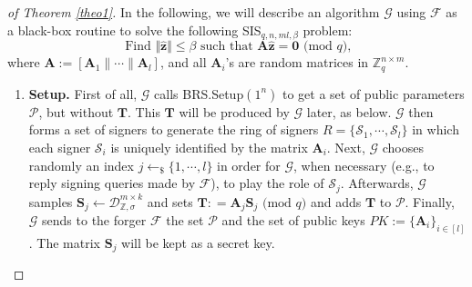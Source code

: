 \documentclass[runningheads]{llncs}
\begin{document}
\begin{proof}[of Theorem \ref{theo1}]
	
	In the following, we will describe an algorithm $\mathcal{G}$ using $\mathcal{F}$ as a black-box routine to solve the following \textsf{SIS}$_{q,n,ml, \beta}$ problem:
			\begin{equation}\label{key}
		\text{ Find }  \Vert \widehat{\mathbf{z}} \Vert \leq \beta \text{ such that } \mathbf{A}\widehat{\mathbf{z}}=\mathbf{0} \text{ (mod } q), 
			\end{equation}
			 where  $\mathbf{A}:=[\mathbf{A}_1\|\cdots\|\mathbf{A}_l]$, and all $\mathbf{A}_i$'s are random matrices in $\mathbb{Z}_q^{n \times m}$.
	\begin{enumerate}
		\item \textbf{Setup.} First of all, $\mathcal{G}$ calls \textsf{BRS.Setup}$(1^{n})$ to get a set of public parameters $\mathcal{P}$, but without $\mathbf{T}$. This $\mathbf{T}$ will be produced by $\mathcal{G}$ later, as below.  $\mathcal{G}$ then forms a set of signers to generate the ring of signers $R=\{\mathcal{S}_1, \cdots, \mathcal{S}_l \}$ in  which each signer $\mathcal{S}_i$ is uniquely identified by the matrix $\mathbf{A}_i$. Next,  $\mathcal{G}$ chooses randomly an index $j \leftarrow_{\$} \{1, \cdots, l \}$ in order for $\mathcal{G}$, when necessary (e.g., to  reply signing queries made by $\mathcal{F}$), to  play the role of  $\mathcal{S}_{j}$. Afterwards, $\mathcal{G}$ samples $\mathbf{S}_{j} \leftarrow \mathcal{D}_{\mathbb{Z}, \sigma}^{m \times k}$ and sets $\mathbf{T}: =\mathbf{A}_{j}\mathbf{S}_{j} \text{ (mod } q)$ and adds $\mathbf{T}$ to $\mathcal{P}$. Finally, $\mathcal{G}$ sends to the forger $\mathcal{F}$ the set $\mathcal{P}$ and the set of public keys $PK:=\{\mathbf{A}_i\}_{i\in [l]}$. The matrix $\mathbf{S}_{j}$ will be kept as a secret key.
		
		
		

\end{enumerate}
\end{proof}
\end{document}
